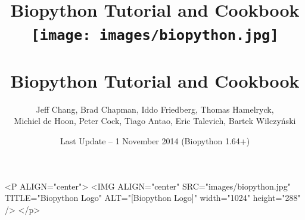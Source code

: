 \documentclass{report}
\begin{document}
\begin{htmlonly}
\title{Biopython Tutorial and Cookbook}
\end{htmlonly}
\begin{latexonly}
\title{
\texttt{[image: images/biopython.jpg]}\\
~\\
Biopython Tutorial and Cookbook}
\end{latexonly}

\author{Jeff Chang, Brad Chapman, Iddo Friedberg, Thomas Hamelryck, \\
Michiel de Hoon, Peter Cock, Tiago Antao, Eric Talevich, Bartek Wilczy\'{n}ski}
\date{Last Update -- 1 November 2014 (Biopython 1.64+)}

\begin{rawhtml}
<P ALIGN="center">
<IMG ALIGN="center" SRC="images/biopython.jpg" TITLE="Biopython Logo" ALT="[Biopython Logo]" width="1024" height="288" />
</p>
\end{rawhtml}

\maketitle
\tableofcontents








\end{document}
